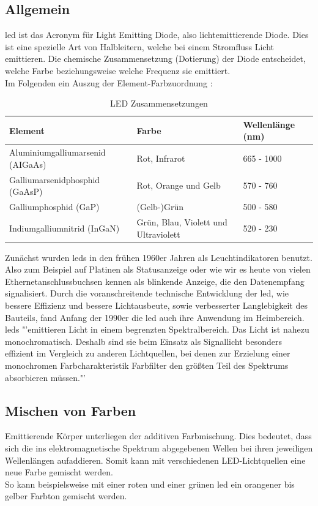 \documentclass[11pt]{scrartcl}
\begin{document}
\subsection{Allgemein}
\ac{led} ist das Acronym für Light Emitting Diode, also lichtemittierende Diode. Dies ist eine spezielle Art von Halbleitern,
welche bei einem Stromfluss Licht emittieren. Die chemische Zusammensetzung (Dotierung) der Diode entscheidet, welche Farbe
beziehungsweise welche Frequenz sie emittiert.\\
Im Folgenden ein Auszug der Element-Farbzuordnung \cite{wikiLed}:
\begin{table}[H]
    \small
    \begin{tabularx}{\textwidth}{|l|l|l|}
        \hline Element & Farbe & Wellenlänge (nm)\\\hline
        Aluminiumgalliumarsenid (AIGaAs) & Rot, Infrarot & 665 - 1000\\\hline
        Galliumarsenidphosphid (GaAsP) & Rot, Orange und Gelb & 570 - 760\\\hline
        Galliumphosphid (GaP) & (Gelb-)Grün & 500 - 580\\\hline
        Indiumgalliumnitrid (InGaN) &  Grün, Blau, Violett und Ultraviolett & 520 - 230\\\hline
    \end{tabularx}
    \caption{LED Zusammensetzungen}
\end{table}
\noindent
Zunächst wurden \ac{led}s in den frühen 1960er Jahren als Leuchtindikatoren benutzt. Also zum Beispiel auf
Platinen als Statusanzeige oder wie wir es heute von vielen Ethernetanschlussbuchsen kennen als blinkende Anzeige, die den Datenempfang
signalisiert. Durch die voranschreitende technische Entwicklung der \ac{led}, wie bessere Effizienz und bessere Lichtausbeute, sowie verbesserter
Langlebigkeit des Bauteils, fand Anfang der 1990er die \ac{led} auch ihre Anwendung im Heimbereich.\\
\ac{led}s "'emittieren Licht in einem begrenzten Spektralbereich. Das Licht ist nahezu monochromatisch. Deshalb sind sie beim Einsatz als
Signallicht besonders effizient im Vergleich zu anderen Lichtquellen, bei denen zur Erzielung einer monochromen Farbcharakteristik
Farbfilter den größten Teil des Spektrums absorbieren müssen."'\\
\cite{wikiLed}

\subsection{Mischen von Farben}\label{colormixing}
Emittierende Körper unterliegen der additiven Farbmischung. Dies bedeutet, dass sich die ins elektromagnetische Spektrum abgegebenen
Wellen bei ihren jeweiligen Wellenlängen aufaddieren. Somit kann mit verschiedenen LED-Lichtquellen eine neue Farbe gemischt
werden.\\
So kann beispielsweise mit einer roten und einer grünen \ac{led} ein orangener bis gelber Farbton gemischt werden.
\end{document}
